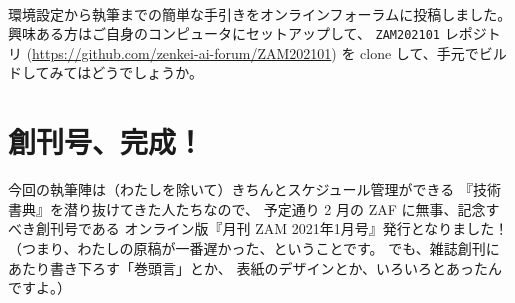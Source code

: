 \documentclass[dvipdfmx,autodetect-engine,10pt,b5paper,papersize,openany,dvipsnames]{jsbook}
\begin{document}
\begin{multicols}{2}
\vspace{5.0cm}


\vspace{7.0cm}



\vspace{7.0cm}

環境設定から執筆までの簡単な手引きをオンラインフォーラムに投稿しました。
興味ある方はご自身のコンピュータにセットアップして、
\texttt{ZAM202101} レポジトリ
(\url{https://github.com/zenkei-ai-forum/ZAM202101})
を clone して、手元でビルドしてみてはどうでしょうか。


\section{創刊号、完成！}
今回の執筆陣は（わたしを除いて）きちんとスケジュール管理ができる
『技術書典』を潜り抜けてきた人たちなので、
予定通り 2 月の ZAF に無事、記念すべき創刊号である
オンライン版『月刊 ZAM 2021年1月号』発行となりました！
（つまり、わたしの原稿が一番遅かった、ということです。
でも、雑誌創刊にあたり書き下ろす「巻頭言」とか、
表紙のデザインとか、いろいろとあったんですよ。）


\end{multicols}
\end{document}
